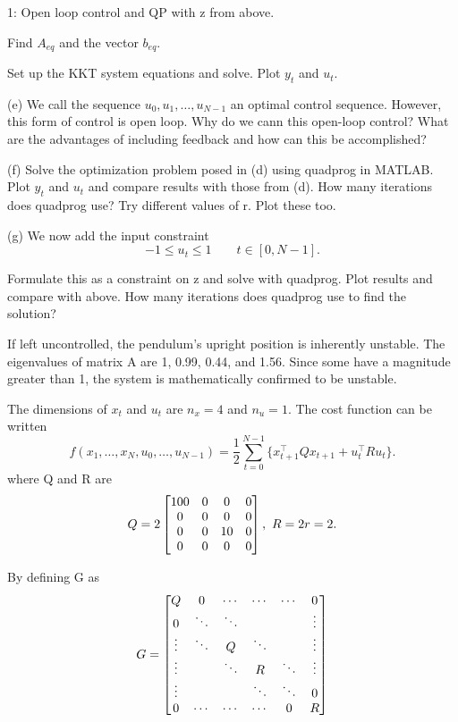 \begin{problem}{1: Open loop control and QP}
with z from above.

\medskip Find $A_{eq}$ and the vector $b_{eq}$.

\medskip Set up the KKT system equations and solve. Plot $y_t$ and $u_t$.

\medskip (e) We call the sequence $u_0, u_1,\dots,u_{N-1}$ an optimal control sequence. However, this form of control is open loop.
Why do we cann this open-loop control? What are the advantages of including feedback and how can this be accomplished?

\medskip (f) Solve the optimization problem posed in (d) using quadprog in MATLAB. Plot $y_t$ and $u_t$ and compare results with those from (d).
How many iterations does quadprog use? Try different values of r. Plot these too.

\medskip (g) We now add the input constraint
\[
  -1 \leq u_t \leq 1 \qquad t \in [0, N-1]
  .\]

Formulate this as a constraint on z and solve with quadprog. Plot results and compare with above.
How many iterations does quadprog use to find the solution?

\end{problem}



If left uncontrolled, the pendulum's upright position is inherently unstable.
The eigenvalues of matrix A are 1, 0.99, 0.44, and 1.56. Since some have a magnitude greater than 1, the system is mathematically confirmed to be unstable.


The dimensions of $x_t$ and $u_t$ are $n_x = 4$ and $n_u = 1$. The cost function can be written
\[
  f(x_1,\dots,x_N, u_0,\dots,u_{N-1}) = \frac{1}{2} \sum_{t=0}^{N-1}\{x_{t+1}^{\top}Qx_{t+1}+ u_t^{\top}Ru_t\}
  .\]
where Q and R are
\[
  Q = 2 \begin{bmatrix} 100 & 0 & 0 & 0 \\ 0 & 0 & 0 & 0 \\ 0 & 0 & 10 & 0 \\ 0 & 0 & 0 & 0 \end{bmatrix},\  R = 2r = 2
  .\]

By defining G as
\[
  G = \begin{bmatrix} Q  & 0 & \cdots & \cdots & \cdots & 0 \\
    0 & \ddots & \ddots &  &  & \vdots \\ \vdots & \ddots & Q & \ddots &  & \vdots \\ \vdots &  & \ddots & R & \ddots & \vdots \\ \vdots  &  &  & \ddots & \ddots & 0 \\ 0 &  \cdots & \cdots & \cdots & 0 & R \end{bmatrix}
\]

